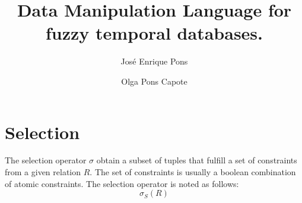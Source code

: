 \documentclass{llncs}
\begin{document}
\mainmatter              %
%
\title{Data Manipulation Language for fuzzy temporal databases.}
%
%
\author{Jos\'e Enrique Pons \and Olga Pons Capote}
%
%
%

\maketitle              %

\begin{abstract}

\end{abstract}


\section{\label{sec:selection}Selection}
The selection operator $\sigma$ obtain a subset of tuples that fulfill a set of constraints from a given relation $R$. The set of constraints is usually a boolean combination of atomic constraints. The selection operator is noted as follows:
\begin{equation}
 \label{eq:selection}
\sigma_{S} \left( R \right)
\end{equation}
\end{document}
